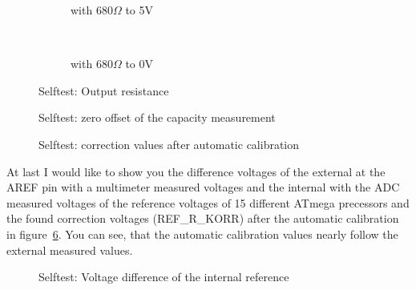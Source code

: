 \begin{figure}[H]
  \begin{subfigure}[b]{9cm}
  \centering
    \resizebox{9cm}{!}{}
    \caption{with \(680 \Omega\) to 5V}
    \label{fig:SelfTRoL}
  \end{subfigure}
  ~
  \begin{subfigure}[b]{9cm}
  \centering
    \resizebox{9cm}{!}{}
    \caption{with \(680 \Omega\) to 0V}
    \label{fig:SelfTRoH}
  \end{subfigure}
  \caption{Selftest: Output resistance}
\end{figure}

\begin{figure}[H]
  \centering
  \resizebox{9cm}{!}{}
  \caption{Selftest: zero offset of the capacity measurement}
  \label{fig:SelfTcap}
\end{figure}

\begin{figure}[H]
  \centering
  \resizebox{9cm}{!}{}
  \caption{Selftest: correction values after automatic calibration}
  \label{fig:SelfTrefKorr}
\end{figure}

At last I would like to show you the difference voltages of the external at the
AREF pin with a multimeter measured voltages and the internal with the ADC
measured voltages of the reference voltages of 15 different ATmega precessors
and the found correction voltages (REF\_R\_KORR) after the automatic calibration in
figure~\ref{fig:SelfTrefDiff}.
You can see, that the automatic calibration values nearly follow the external measured values.

\begin{figure}[H]
  \centering
  \resizebox{9cm}{!}{}
  \caption{Selftest: Voltage difference of the internal reference}
  \label{fig:SelfTrefDiff}
\end{figure}

